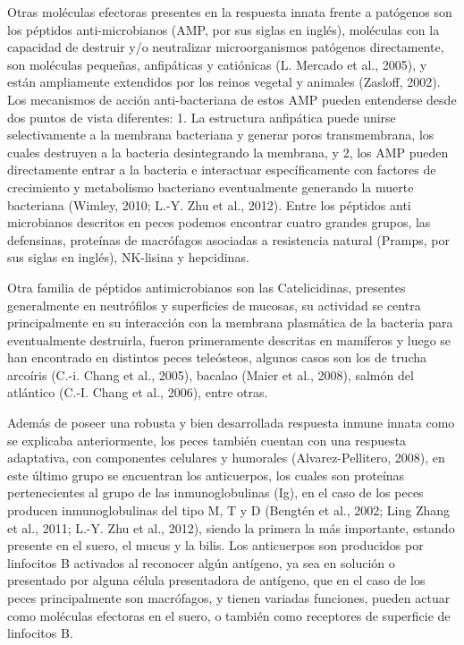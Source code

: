 \documentclass[12pt,a4paper,]{article}
\begin{document}
Otras moléculas efectoras presentes en la respuesta innata frente a
patógenos son los péptidos anti-microbianos (AMP, por sus siglas en
inglés), moléculas con la capacidad de destruir y/o neutralizar
microorganismos patógenos directamente, son moléculas pequeñas,
anfipáticas y catiónicas (L. Mercado et al., 2005)⁠, y están ampliamente
extendidos por los reinos vegetal y animales (Zasloff, 2002). Los
mecanismos de acción anti-bacteriana de estos AMP pueden entenderse
desde dos puntos de vista diferentes: 1. La estructura anfipática puede
unirse selectivamente a la membrana bacteriana y generar poros
transmembrana, los cuales destruyen a la bacteria desintegrando la
membrana, y 2, los AMP pueden directamente entrar a la bacteria e
interactuar específicamente con factores de crecimiento y metabolismo
bacteriano eventualmente generando la muerte bacteriana (Wimley, 2010;
L.-Y. Zhu et al., 2012)⁠. Entre los péptidos anti microbianos descritos
en peces podemos encontrar cuatro grandes grupos, las defensinas,
proteínas de macrófagos asociadas a resistencia natural (Pramps, por sus
siglas en inglés), NK-lisina y hepcidinas.

Otra familia de péptidos antimicrobianos son las Catelicidinas,
presentes generalmente en neutrófilos y superficies de mucosas, su
actividad se centra principalmente en su interacción con la membrana
plasmática de la bacteria para eventualmente destruirla, fueron
primeramente descritas en mamíferos y luego se han encontrado en
distintos peces teleósteos, algunos casos son los de trucha arcoíris
(C.-i. Chang et al., 2005)⁠, bacalao (Maier et al., 2008), salmón del
atlántico (C.-I. Chang et al., 2006), entre otras.

Además de poseer una robusta y bien desarrollada respuesta inmune innata
como se explicaba anteriormente, los peces también cuentan con una
respuesta adaptativa, con componentes celulares y humorales
(Alvarez-Pellitero, 2008)⁠, en este último grupo se encuentran los
anticuerpos, los cuales son proteínas pertenecientes al grupo de las
inmunoglobulinas (Ig), en el caso de los peces producen inmunoglobulinas
del tipo M, T y D (Bengtén et al., 2002; Ling Zhang et al., 2011; L.-Y.
Zhu et al., 2012)⁠, siendo la primera la más importante, estando
presente en el suero, el mucus y la bilis. Los anticuerpos son
producidos por linfocitos B activados al reconocer algún antígeno, ya
sea en solución o presentado por alguna célula presentadora de antígeno,
que en el caso de los peces principalmente son macrófagos, y tienen
variadas funciones, pueden actuar como moléculas efectoras en el suero,
o también como receptores de superficie de linfocitos B.
\end{document}
